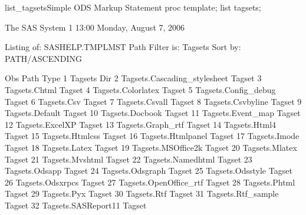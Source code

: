 \begin{fvcode}{list_tagsets}{Simple ODS Markup Statement}
       proc template;
           list tagsets;

                               The SAS System                               1
                                                  13:00 Monday, August 7, 2006

                Listing of: SASHELP.TMPLMST
                Path Filter is: Tagsets
                Sort by: PATH/ASCENDING
 
                Obs    Path                             Type
                 1     Tagsets                          Dir   
                 2     Tagsets.Cascading_stylesheet     Tagset
                 3     Tagsets.Chtml                    Tagset
                 4     Tagsets.Colorlatex               Tagset
                 5     Tagsets.Config_debug             Tagset
                 6     Tagsets.Csv                      Tagset
                 7     Tagsets.Csvall                   Tagset
                 8     Tagsets.Csvbyline                Tagset
                 9     Tagsets.Default                  Tagset
                10     Tagsets.Docbook                  Tagset
                11     Tagsets.Event_map                Tagset
                12     Tagsets.ExcelXP                  Tagset
                13     Tagsets.Graph_rtf                Tagset
                14     Tagsets.Html4                    Tagset
                15     Tagsets.Htmlcss                  Tagset
                16     Tagsets.Htmlpanel                Tagset
                17     Tagsets.Imode                    Tagset
                18     Tagsets.Latex                    Tagset
                19     Tagsets.MSOffice2k               Tagset
                20     Tagsets.Mlatex                   Tagset
                21     Tagsets.Mvshtml                  Tagset
                22     Tagsets.Namedhtml                Tagset
                23     Tagsets.Odsapp                   Tagset
                24     Tagsets.Odsgraph                 Tagset
                25     Tagsets.Odsstyle                 Tagset
                26     Tagsets.Odsxrpcs                 Tagset
                27     Tagsets.OpenOffice_rtf           Tagset
                28     Tagsets.Phtml                    Tagset
                29     Tagsets.Pyx                      Tagset
                30     Tagsets.Rtf                      Tagset
                31     Tagsets.Rtf_sample               Tagset
                32     Tagsets.SASReport11              Tagset

\end{fvcode}
